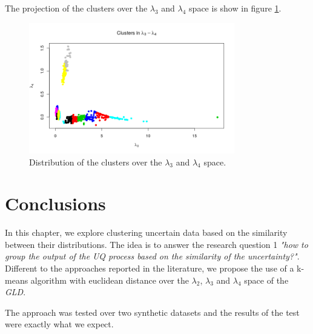 The projection of the clusters over the $\lambda_{3}$ and $\lambda_{4}$ space is show in figure \ref{fig:dataset2_l3l4_l3_l4}.

\begin{figure}[H]
    \centering
    \includegraphics[width=0.8\textwidth]{img/gld_clustering/Dataset2/nuevo/l3_l4/l3_l4.png}
    \caption{Distribution of the clusters over the $\lambda_{3}$ and $\lambda_{4}$ space.}
    \label{fig:dataset2_l3l4_l3_l4}
\end{figure}


\section{Conclusions}\label{sec:conclusions}

In this chapter, we explore clustering uncertain data based on the similarity between their distributions. The idea is to answer the research question 1 \textit{"how to group the output of the UQ process based on the similarity of the uncertainty?"}. Different to the approaches reported in the literature, we propose the use of a k-means algorithm with euclidean distance over the $\lambda_{2}$, $\lambda_{3}$ and $\lambda_{4}$ space of the \textit{GLD}. 

The approach was tested over two synthetic datasets and the results of the  test were exactly what we expect.


